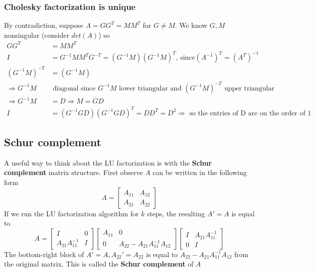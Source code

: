 \documentclass{article}
\begin{document}
\subsubsection{Cholesky factorization is unique}
By contradiction, suppose $A = GG^T = MM^T$ for $G \neq M$. We know $G, M$ nonsingular (consider $det(A)$) so
\begin{align*}
    GG^T &= MM^T\\
    I &= G^{-1}MM^TG^{-T} = (G^{-1}M)(G^{-1}M)^T \textrm{, since} (A^{-1})^T = (A^T)^{-1}\\
    (G^{-1}M)^{-T} &= (G^{-1}M)\\ \Rightarrow G^{-1}M & \textrm{ diagonal since } G^{-1}M \textrm{ lower triangular and } (G^{-1}M)^{-T} \textrm{ upper triangular}\\
    \Rightarrow G^{-1}M &= D \Rightarrow M = GD\\
    I &= (G^{-1}GD)(G^{-1}GD)^T = DD^T = D^2 \Rightarrow \textrm{ so the entries of D are on the order of 1}
\end{align*}

\subsection{Schur complement}
A useful way to think about the LU factorization is with the \textbf{Schur complement} matrix structure. First observe $A$ can be written in the following form
\begin{equation*}
    A = \begin{bmatrix} A_{11} & A_{12}\\ A_{21} & A_{22}\end{bmatrix}
\end{equation*}
If we run the LU factorization algorithm for $k$ steps, the resulting $A' = A$ is equal to 
\begin{equation*}
    A = \begin{bmatrix} I & 0\\ A_{21}A_{11}^{-1} & I\end{bmatrix}
    \begin{bmatrix} A_{11} & 0\\ 0 & A_{22} - A_{21}A_{11}^{-1}A_{12}\end{bmatrix}
    \begin{bmatrix} I & A_{21}A_{11}^{-1}\\ 0 & I\end{bmatrix}
\end{equation*}
The bottom-right block of $A'=A, A_{22}' = A_{22}$ is equal to $A_{22} - A_{21}A_{11}^{-1}A_{12}$ from the original matrix. This is called the \textbf{Schur complement} of $A$
\end{document}
